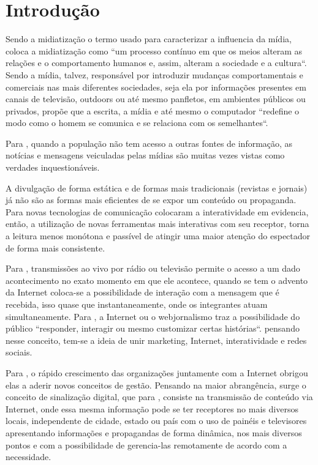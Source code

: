 \chapter[Introdução]{Introdução}
Sendo a midiatização o termo usado para caracterizar a influencia da mídia, \cite[p.59]{hjarvard2012} coloca a midiatização como “um processo contínuo em que os meios alteram as relações e o comportamento humanos e, assim, alteram a sociedade e a cultura“. Sendo a mídia, talvez, responsável por introduzir mudanças comportamentais e comerciais nas mais diferentes sociedades, seja ela por informações presentes em canais de televisão, outdoors ou até mesmo panfletos, em ambientes públicos ou privados, \cite[p.3]{escobar2007} propõe que a escrita, a mídia e até mesmo o computador “redefine o modo como o homem se comunica e se relaciona com os semelhantes“. 

Para \cite{silva2007}, quando a população não tem acesso a outras fontes de informação, as notícias e mensagens veiculadas pelas mídias são muitas vezes vistas como verdades inquestionáveis. 

A divulgação de forma estática e de formas mais tradicionais (revistas e jornais) já não são as formas mais eficientes de se expor um conteúdo ou propaganda. Para \cite[p.2]{escobar2007} novas tecnologias de comunicação colocaram a interatividade em evidencia, então, a utilização de novas ferramentas mais interativas com seu receptor, torna a leitura menos monótona e passível de atingir uma maior atenção do espectador de forma mais consistente.

Para \cite[p.4]{escobar2007}, transmissões ao vivo por rádio ou televisão permite o acesso a um dado acontecimento no exato momento em que ele acontece, quando se tem o advento da Internet coloca-se a possibilidade de interação com a mensagem que é recebida, isso quase que instantaneamente, onde os integrantes atuam simultaneamente. Para \cite{deuze2002}, a Internet ou o webjornalismo traz a possibilidade do público “responder, interagir ou mesmo customizar certas histórias“. pensando nesse conceito, tem-se a ideia de unir marketing, Internet, interatividade e redes sociais. 

Para \cite[p.7]{machado2010}, o rápido crescimento das organizações juntamente com a Internet obrigou elas a aderir novos conceitos de gestão. Pensando na maior abrangência, surge o conceito de sinalização digital, que para \cite[p.37]{machado2010}, consiste na transmissão de conteúdo via Internet, onde essa mesma informação pode se ter receptores no mais diversos locais, independente de cidade, estado ou país com o uso de painéis e televisores apresentando informações e propagandas de forma dinâmica, nos mais diversos pontos e com a possibilidade de gerencia-las remotamente de acordo com a necessidade. 

